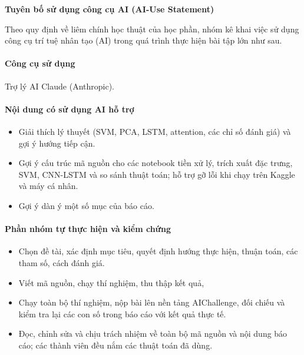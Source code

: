 {}
\begin{center}
  {\Large\bfseries Tuyên bố sử dụng công cụ AI (AI-Use Statement)}
\end{center}
\vspace{0.5em}

Theo quy định về liêm chính học thuật của học phần, nhóm kê khai việc sử dụng công cụ trí tuệ nhân tạo (AI) trong quá trình thực hiện bài tập lớn như sau.

\paragraph*{Công cụ sử dụng} Trợ lý AI Claude (Anthropic).

\paragraph*{Nội dung có sử dụng AI hỗ trợ}
\begin{itemize}
  \item Giải thích lý thuyết (SVM, PCA, LSTM, attention, các chỉ số đánh giá) và gợi ý hướng tiếp cận.
  \item Gợi ý cấu trúc mã nguồn cho các notebook tiền xử lý, trích xuất đặc trưng, SVM, CNN-LSTM và so sánh thuật toán; hỗ trợ gỡ lỗi khi chạy trên Kaggle và máy cá nhân.
  \item Gợi ý dàn ý một số mục của báo cáo.
\end{itemize}

\paragraph*{Phần nhóm tự thực hiện và kiểm chứng}
\begin{itemize}
  \item Chọn đề tài, xác định mục tiêu, quyết định hướng thực hiện, thuận toán, các tham số, cách đánh giá.
  \item Viết mã nguồn, chạy thí nghiệm, thu thập kết quả,
  \item Chạy toàn bộ thí nghiệm, nộp bài lên nền tảng AIChallenge, đối chiếu và kiểm tra lại các con số trong báo cáo với kết quả thực tế.
  \item Đọc, chỉnh sửa và chịu trách nhiệm về toàn bộ mã nguồn và nội dung báo cáo; các thành viên đều nắm các thuật toán đã dùng.
\end{itemize}